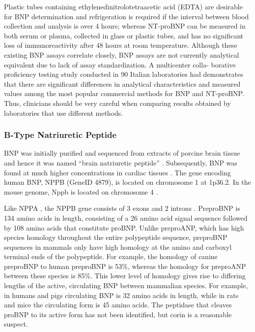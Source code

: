 \documentclass[14pt,a4paper,onecolumn]{article}
\begin{document}
Plastic tubes containing ethylenedinitrolotetraacetic acid (EDTA) are desirable for BNP determination and refrigeration is required if the interval between blood collection and analysis is over 4 hours; whereas NT-proBNP can be measured in both serum or plasma, collected in glass or plastic tubes, and has no significant loss of immunoreactivity after 48 hours at room temperature. Although these existing BNP assays correlate closely, BNP assays are not currently analytical equivalent due to lack of assay standardization.\citep{Omland2008}  A multicenter colla- borative proficiency testing study conducted in 90 Italian laboratories had demonstrates that there are significant differences in analytical characteristics and measured values among the most popular commercial methods for BNP and NT-proBNP. Thus, clinicians should be very careful when comparing results obtained by laboratories that use different methods.\citep{Prontera2009}

\subsubsection{B-Type Natriuretic Peptide}
BNP was initially purified and sequenced from extracts of porcine brain tissue and hence it was named “brain natriuretic peptide” \citep{Sudoh1988}. Subsequently, BNP was found at much higher concentrations in cardiac tissues \citep{Mukoyama1991} \citep{Mukoyama1990}. The gene encoding human BNP, NPPB (GeneID 4879), is located on chromosome 1 at 1p36.2. In the mouse genome, Nppb is located on chromosome 4 \citep{Ogawa1994a}.

Like NPPA , the NPPB gene consists of 3 exons and 2 introns \citep{Ogawa1994a}. PreproBNP is 134 amino acids in length, consisting of a 26 amino acid signal sequence followed by 108 amino acids that constitute proBNP. Unlike preproANP, which has high species homology throughout the entire polypeptide sequence, preproBNP sequences in mammals only have high homology at the amino and carboxyl terminal ends of the polypeptide. For example, the homology of canine preproBNP to human preproBNP is 53\%, whereas the homology for preproANP between these species is 85\%. This lower level of homology gives rise to differing lengths of the active, circulating BNP between mammalian species. For example, in humans and pigs circulating BNP is 32 amino acids in length, while in rats and mice the circulating form is 45 amino acids. The peptidase that cleaves proBNP to its active form has not been identified, but corin is a reasonable suspect.
\end{document}
